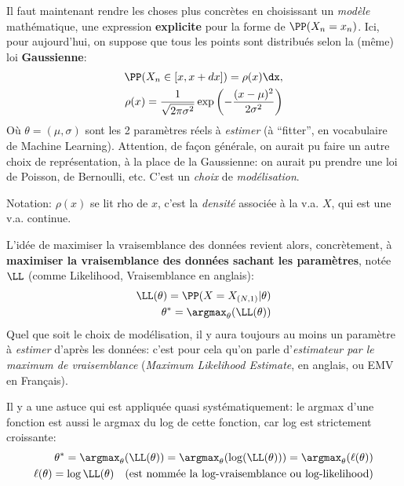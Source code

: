 \documentclass[french,twoside]{article}
\newcommand{\cad}{\text{c'est-à-dire} }
\begin{document}
Il faut maintenant rendre les choses plus concrètes en choisissant un \textit{modèle} mathématique, \cad une expression \textbf{explicite} pour la forme de $\PP(X_n =x_n)$. Ici, pour aujourd'hui, on suppose que tous les points sont distribués selon la (même) loi \textbf{Gaussienne}:
\begin{align}
\PP(X_n\in[x,x+dx]) = \rho(x)\dx, \\
\rho(x) = \frac{1}{\sqrt{2\pi \sigma^2}} \exp\left( -\frac{(x-\mu)^2}{2\sigma^2}\right)
\end{align}
Où $\theta=(\mu,\sigma)$ sont les 2 paramètres réels à \textit{estimer} (à ``fitter'', en vocabulaire de Machine Learning).
Attention, de façon générale, on aurait pu faire un autre choix de représentation, à la place de la Gaussienne: on aurait pu prendre une loi de Poisson, de Bernoulli, etc. C'est un \textit{choix} de \textit{modélisation}.

Notation: $\rho(x)$ se lit rho de $x$, c'est la \textit{densité} associée à la v.a. $X$, qui est une v.a. continue.


L'idée de maximiser la vraisemblance des données revient alors, concrètement, à \textbf{maximiser la vraisemblance des données sachant les paramètres}, notée $\LL$ (comme Likelihood, Vraisemblance en anglais):
\begin{align}
\LL(\theta) = \PP(X= X_{(N,1)}|\theta) \\
\theta^* = \argmax _\theta (\LL(\theta))
\end{align}
Quel que soit le choix de modélisation, il y aura toujours au moins un paramètre à \textit{estimer} d'après les données: c'est pour cela qu'on parle d'\textit{estimateur par le maximum de vraisemblance} (\textit{Maximum Likelihood Estimate}, en anglais, ou EMV en Français).


Il y a une astuce qui est appliquée quasi systématiquement: le argmax d'une fonction est aussi le argmax du log de cette fonction, car log est strictement croissante:
\begin{align}
\theta^* = \argmax _\theta (\LL(\theta)) = \argmax _\theta (\log(\LL(\theta))) = \argmax _\theta (\ell(\theta))\\
\ell(\theta) = \log \LL(\theta) \quad \text{(est nommée la log-vraisemblance ou log-likelihood)}
\end{align}
\end{document}
